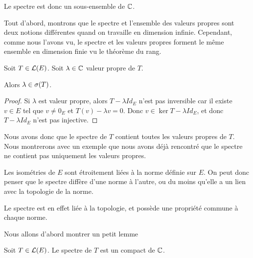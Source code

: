 Le spectre est donc un sous-ensemble de $\mathbb{C}$.

Tout d'abord, montrons que le spectre et l'ensemble des valeurs propres sont
deux notions différentes quand on travaille en dimension infinie. Cependant,
comme nous l'avons vu, le spectre et les valeurs propres forment le même
ensemble en dimension finie vu le théorème du rang.

\begin{proposition}
	Soit $T \in \mathcal{L}(E)$.
	Soit $\lambda \in \mathbb{C}$ valeur propre de $T$.

	Alors $\lambda \in \sigma(T)$.
\end{proposition}

\begin{proof}
	Si $\lambda$ est valeur propre, alors $T - \lambda Id_{E}$ n'est pas
	inversible car il existe $v \in E$ tel que $v \neq 0_{E}$ et $T(v) - \lambda
	v = 0$. Donc $v \in \ker{T - \lambda Id_{E}}$, et donc $T - \lambda Id_{E}$
	n'est pas injective.
\end{proof}

Nous avons donc que le spectre de $T$ contient toutes les valeurs propres de
$T$.
Nous montrerons avec un exemple que nous avons déjà rencontré que le spectre ne
contient pas uniquement les valeurs propres.

Les isométries de $E$ sont étroitement liées à la norme définie sur $E$. On peut
donc penser que le spectre diffère d'une norme à l'autre, ou du moins qu'elle a
un lien avec la topologie de la norme.

Le spectre est en effet liée à la topologie, et possède une propriété commune à
chaque norme.

Nous allons d'abord montrer un petit lemme 
\begin{proposition}
	Soit $T \in \mathcal{L}(E)$.
	Le spectre de $T$ est un compact de $\mathbb{C}$.
\end{proposition}


